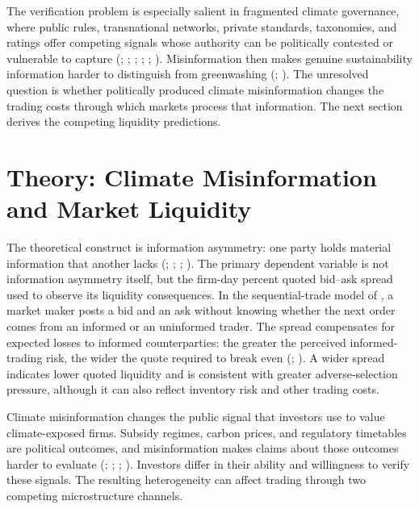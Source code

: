 \documentclass{article}
\theoremstyle{plain}
\begin{document}
The verification problem is especially salient in fragmented climate governance, where public rules, transnational networks, private standards, taxonomies, and ratings offer competing signals whose authority can be politically contested or vulnerable to capture (\cite{KeohaneVictor2011}; \cite{HaleHeld2018}; \cite{Bodansky2016}; \cite{Rajamani2017}; \cite{AbbottSnidal2000}; \cite{ButheMattli2011}). Misinformation then makes genuine sustainability information harder to distinguish from greenwashing (\cite{delmas2011drivers}; \cite{marquis2016scrutiny}). The unresolved question is whether politically produced climate misinformation changes the trading costs through which markets process that information. The next section derives the competing liquidity predictions.

\section{Theory: Climate Misinformation and Market Liquidity}
\label{sec:theory}

The theoretical construct is information asymmetry: one party holds material information that another lacks (\cite{Akerlof1970}; \cite{Stiglitz2000}; \cite{StiglitzKosenko2024a}; \cite{StiglitzKosenko2024b}). The primary dependent variable is not information asymmetry itself, but the firm-day percent quoted bid--ask spread used to observe its liquidity consequences. In the sequential-trade model of \textcite{GlostenMilgrom1985}, a market maker posts a bid and an ask without knowing whether the next order comes from an informed or an uninformed trader. The spread compensates for expected losses to informed counterparties: the greater the perceived informed-trading risk, the wider the quote required to break even (\cite{EasleyOHara1992}; \cite{Hasbrouck1991}). A wider spread indicates lower quoted liquidity and is consistent with greater adverse-selection pressure, although it can also reflect inventory risk and other trading costs.

Climate misinformation changes the public signal that investors use to value climate-exposed firms. Subsidy regimes, carbon prices, and regulatory timetables are political outcomes, and misinformation makes claims about those outcomes harder to evaluate (\cite{PastorVeronesi2012}; \cite{PastorVeronesi2013}; \cite{delmas2011drivers}; \cite{marquis2016scrutiny}). Investors differ in their ability and willingness to verify these signals. The resulting heterogeneity can affect trading through two competing microstructure channels.
\end{document}
